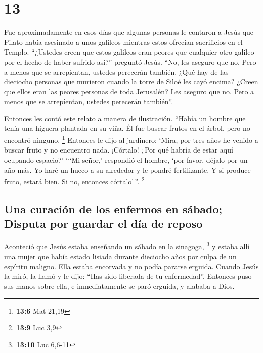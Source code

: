 \hypertarget{section-12}{%
\section{13}\label{section-12}}

 Fue aproximadamente en esos días que algunas personas le
contaron a Jesús que Pilato había asesinado a unos galileos mientras
estos ofrecían sacrificios en el Templo.  ``¿Ustedes creen
que estos galileos eran peores que cualquier otro galileo por el hecho
de haber sufrido así?'' preguntó Jesús.  ``No, les aseguro
que no. Pero a menos que se arrepientan, ustedes perecerán también.
 ¿Qué hay de las dieciocho personas que murieron cuando la
torre de Siloé les cayó encima? ¿Creen que ellos eran las peores
personas de toda Jerusalén?  Les aseguro que no. Pero a
menos que se arrepientan, ustedes perecerán también''.

 Entonces les contó este relato a manera de ilustración.
``Había un hombre que tenía una higuera plantada en su viña. Él fue
buscar frutos en el árbol, pero no encontró ninguno. \footnote{\textbf{13:6}
  Mat 21,19}  Entonces le dijo al jardinero: `Mira, por
tres años he venido a buscar fruto y no encuentro nada. ¡Córtalo! ¿Por
qué habría de estar aquí ocupando espacio?'  ```Mi señor,'
respondió el hombre, `por favor, déjalo por un año más. Yo haré un hueco
a su alrededor y le pondré fertilizante.  Y si produce
fruto, estará bien. Si no, entonces córtalo'\,''. \footnote{\textbf{13:9}
  Luc 3,9}

\hypertarget{una-curaciuxf3n-de-los-enfermos-en-suxe1bado-disputa-por-guardar-el-duxeda-de-reposo}{%
\subsection{Una curación de los enfermos en sábado; Disputa por guardar
el día de
reposo}\label{una-curaciuxf3n-de-los-enfermos-en-suxe1bado-disputa-por-guardar-el-duxeda-de-reposo}}

 Aconteció que Jesús estaba enseñando un sábado en la
sinagoga, \footnote{\textbf{13:10} Luc 6,6-11}  y estaba
allí una mujer que había estado lisiada durante dieciocho años por culpa
de un espíritu maligno. Ella estaba encorvada y no podía pararse
erguida.  Cuando Jesús la miró, la llamó y le dijo: ``Has
sido liberada de tu enfermedad''.  Entonces puso sus
manos sobre ella, e inmediatamente se paró erguida, y alababa a Dios.

